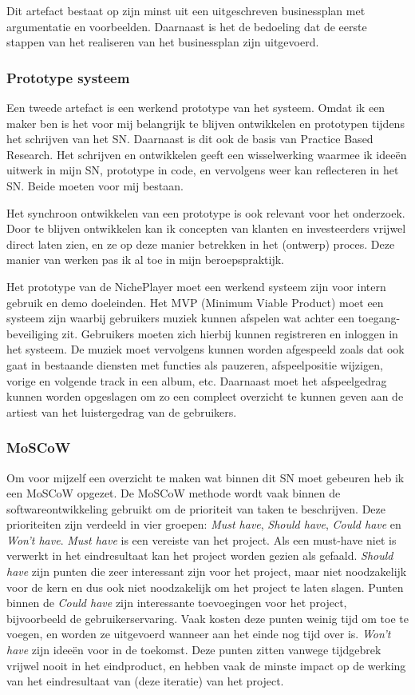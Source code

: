 Dit artefact bestaat op zijn minst uit een uitgeschreven businessplan met argumentatie en voorbeelden. Daarnaast is het de bedoeling dat de eerste stappen van het realiseren van het businessplan zijn uitgevoerd.

\subsubsection*{Prototype systeem}
Een tweede artefact is een werkend prototype van het systeem. Omdat ik een maker ben is het voor mij belangrijk te blijven ontwikkelen en prototypen tijdens het schrijven van het SN. Daarnaast is dit ook de basis van Practice Based Research. Het schrijven en ontwikkelen geeft een wisselwerking waarmee ik ideeën uitwerk in mijn SN, prototype in code, en vervolgens weer kan reflecteren in het SN. Beide moeten voor mij bestaan.

Het synchroon ontwikkelen van een prototype is ook relevant voor het onderzoek. Door te blijven ontwikkelen kan ik concepten van klanten en investeerders vrijwel direct laten zien, en ze op deze manier betrekken in het (ontwerp) proces. Deze manier van werken pas ik al toe in mijn beroepspraktijk.

Het prototype van de NichePlayer moet een werkend systeem zijn voor intern gebruik en demo doeleinden. Het MVP (Minimum Viable Product) moet een systeem zijn waarbij gebruikers muziek kunnen afspelen wat achter een toegang-beveiliging zit. Gebruikers moeten zich hierbij kunnen registreren en inloggen in het systeem. De muziek moet vervolgens kunnen worden afgespeeld zoals dat ook gaat in bestaande diensten met functies als pauzeren, afspeelpositie wijzigen, vorige en volgende track in een album, etc. Daarnaast moet het afspeelgedrag kunnen worden opgeslagen om zo een compleet overzicht te kunnen geven aan de artiest van het luistergedrag van de gebruikers.

\subsubsection*{MoSCoW}
Om voor mijzelf een overzicht te maken wat binnen dit SN moet gebeuren heb ik een MoSCoW opgezet. De MoSCoW methode wordt vaak binnen de softwareontwikkeling gebruikt om de prioriteit van taken te beschrijven. Deze prioriteiten zijn verdeeld in vier groepen: \textit{Must have}, \textit{Should have}, \textit{Could have} en \textit{Won't have}. \textit{Must have} is een vereiste van het project. Als een must-have niet is verwerkt in het eindresultaat kan het project worden gezien als gefaald. \textit{Should have} zijn punten die zeer interessant zijn voor het project, maar niet noodzakelijk voor de kern en dus ook niet noodzakelijk om het project te laten slagen. Punten binnen de \textit{Could have} zijn interessante toevoegingen voor het project, bijvoorbeeld de gebruikerservaring. Vaak kosten deze punten weinig tijd om toe te voegen, en worden ze uitgevoerd wanneer aan het einde nog tijd over is. \textit{Won't have} zijn ideeën voor in de toekomst. Deze punten zitten vanwege tijdgebrek vrijwel nooit in het eindproduct, en hebben vaak de minste impact op de werking van het eindresultaat van (deze iteratie) van het project.

